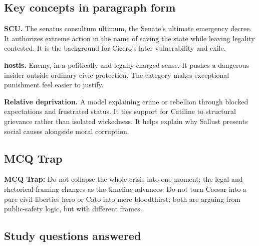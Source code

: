 \documentclass[11pt]{article}
\begin{document}
\subsection{Key concepts in paragraph form}

\textbf{SCU.} The senatus consultum ultimum, the Senate's ultimate emergency decree. It authorizes extreme action in the name of saving the state while leaving legality contested. It is the background for Cicero's later vulnerability and exile.

\textbf{hostis.} Enemy, in a politically and legally charged sense. It pushes a dangerous insider outside ordinary civic protection. The category makes exceptional punishment feel easier to justify.

\textbf{Relative deprivation.} A model explaining crime or rebellion through blocked expectations and frustrated status. It ties support for Catiline to structural grievance rather than isolated wickedness. It helps explain why Sallust presents social causes alongside moral corruption.

\subsection{MCQ Trap}

\begin{quotebox}
\textbf{MCQ Trap:} Do not collapse the whole crisis into one moment; the legal and rhetorical framing changes as the timeline advances. Do not turn Caesar into a pure civil-liberties hero or Cato into mere bloodthirst; both are arguing from public-safety logic, but with different frames.
\end{quotebox}

\subsection{Study questions answered}
\end{document}
